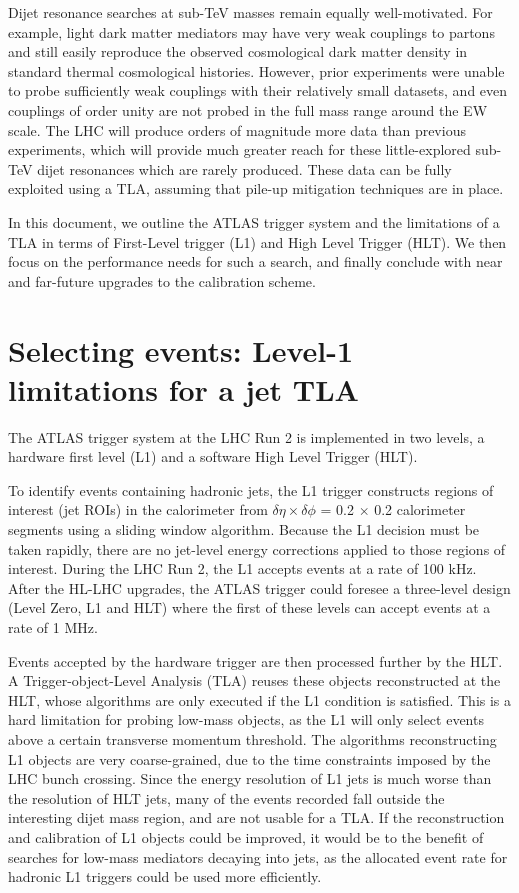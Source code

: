 \documentclass[a4paper,justified]{tufte-handout}
\begin{document}
Dijet resonance searches at sub-TeV masses remain equally well-motivated. For example, light dark matter mediators may have very weak couplings to partons and still easily reproduce the observed cosmological dark matter density in standard thermal cosmological histories. However, prior experiments were unable to probe sufficiently weak couplings with their relatively small datasets, and even couplings of order unity are not probed in the full mass range around the EW scale. The LHC will produce orders of magnitude more data than previous experiments, which will provide much greater reach  for these little-explored sub-TeV dijet resonances which are rarely produced. These data can be fully exploited using a TLA, assuming that pile-up mitigation techniques are in place. 

In this document, we outline the ATLAS trigger system and the limitations of a TLA in terms of First-Level trigger (L1)  and High Level Trigger (HLT). We then focus on the performance needs for such a search, and finally conclude with near and far-future upgrades to the calibration scheme. 

\section{Selecting events: Level-1 limitations for a jet TLA} \label{sec:L1Limitations}

The ATLAS trigger system at the LHC Run 2 is implemented in two levels, a hardware first level (L1) and a software High Level Trigger (HLT).

To identify events containing hadronic jets, the L1 trigger constructs regions of interest (jet ROIs) in the calorimeter from $ \delta\eta \times \delta\phi$ = 0.2 $\times$ 0.2 calorimeter segments using a sliding window algorithm. Because the L1 decision must be taken rapidly, there are no jet-level energy corrections applied to those regions of interest. During the LHC Run 2, the L1 accepts events at a rate of 100 kHz. After the HL-LHC upgrades, the ATLAS trigger could foresee a three-level design (Level Zero, L1 and HLT)  where the first of these levels can accept events at a rate of 1 MHz. 

Events accepted by the hardware trigger are then processed further by the HLT. A Trigger-object-Level Analysis (TLA) reuses these objects reconstructed at the HLT, whose algorithms are only executed if the L1 condition is satisfied. This is a hard limitation for probing low-mass objects, as the L1 will only select events above a certain transverse momentum threshold. The algorithms reconstructing L1 objects are very coarse-grained, due to the time constraints imposed by the LHC bunch crossing. Since the energy resolution of L1 jets is much worse than the resolution of HLT jets, many of the events recorded fall outside the interesting dijet mass region, and are not usable for a TLA. If the reconstruction and calibration of L1 objects could be improved, it would be to the benefit of searches for low-mass mediators decaying into jets, as the allocated event rate for hadronic L1 triggers could be used more efficiently. 
\end{document}
